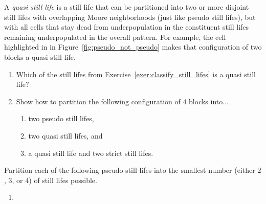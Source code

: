 \begin{multicols}{2}
	
	\mfilbreak
	
	
	\begin{problem}\label{exer:quasi_still_life}
		A \emph{quasi still life} is a still life that can be partitioned into two or more disjoint still lifes with overlapping Moore neighborhoods (just like pseudo still lifes), but with all cells that stay dead from underpopulation in the constituent still lifes remaining underpopulated in the overall pattern. For example, the cell highlighted in  in Figure~\ref{fig:pseudo_not_pseudo} makes that configuration of two blocks a quasi still life.\smallskip
		
		\begin{enumerate}[label=\bf\color{ocre}(\alph*)]
			\item Which of the still lifes from Exercise~\ref{exer:classify_still_lifes} is a quasi still life?
			
			\item Show how to partition the following configuration of $4$ blocks into...
			
			\begin{center}
			\end{center}
			
			\begin{enumerate}[label=\bf\color{ocre}(\roman*)]
				\item two pseudo still lifes,
				
				\item two quasi still lifes, and
				
				\item a quasi still life and two strict still lifes.
			\end{enumerate}
		\end{enumerate}
	\end{problem}
	
	
	\mfilbreak
	
	
	\begin{problemstar}\label{exer:pseudo_few_colors}
		Partition each of the following pseudo still lifes into the smallest number (either $2$, $3$, or $4$) of still lifes possible.\setlength{\columnsep}{0pt}\vspace*{-0.25cm}
		
		\begin{multicols}{2}
			\begin{enumerate}[label=(\alph*),series=exer_pseudo]
				\item[\bf\color{ocre}(a)] 
				

\end{enumerate}
\end{multicols}
\end{problemstar}
\end{multicols}
